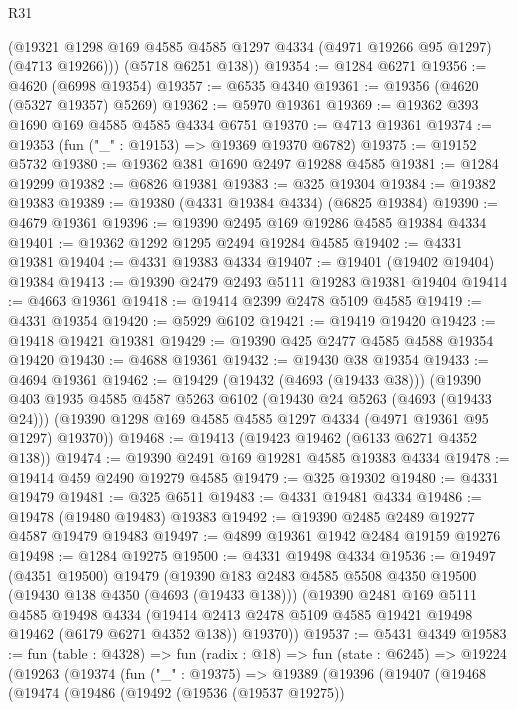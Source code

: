 \begin{lexlean}{R31}
\begin{coremodule}
        (@19321 @1298 @169 @4585 @4585 @1297 @4334 (@4971 @19266 @95 @1297) (@4713 @19266)))
      (@5718 @6251 @138))
@19354 := @1284 @6271
@19356 := @4620 (@6998 @19354)
@19357 := @6535 @4340
@19361 := @19356 (@4620 (@5327 @19357) @5269)
@19362 := @5970 @19361
@19369 := @19362 @393 @1690 @169 @4585 @4585 @4334 @6751
@19370 := @4713 @19361
@19374 := @19353 (fun ("_" : @19153) => @19369 @19370 @6782)
@19375 := @19152 @5732
@19380 := @19362 @381 @1690 @2497 @19288 @4585
@19381 := @1284 @19299
@19382 := @6826 @19381
@19383 := @325 @19304
@19384 := @19382 @19383
@19389 := @19380 (@4331 @19384 @4334) (@6825 @19384)
@19390 := @4679 @19361
@19396 := @19390 @2495 @169 @19286 @4585 @19384 @4334
@19401 := @19362 @1292 @1295 @2494 @19284 @4585
@19402 := @4331 @19381
@19404 := @4331 @19383 @4334
@19407 := @19401 (@19402 @19404) @19384
@19413 := @19390 @2479 @2493 @5111 @19283 @19381 @19404
@19414 := @4663 @19361
@19418 := @19414 @2399 @2478 @5109 @4585
@19419 := @4331 @19354
@19420 := @5929 @6102
@19421 := @19419 @19420
@19423 := @19418 @19421 @19381
@19429 := @19390 @425 @2477 @4585 @4588 @19354 @19420
@19430 := @4688 @19361
@19432 := @19430 @38 @19354
@19433 := @4694 @19361
@19462 := @19429
    (@19432 (@4693 (@19433 @38)))
    (@19390
      @403
      @1935
      @4585
      @4587
      @5263
      @6102
      (@19430 @24 @5263 (@4693 (@19433 @24)))
      (@19390 @1298 @169 @4585 @4585 @1297 @4334 (@4971 @19361 @95 @1297) @19370))
@19468 := @19413 (@19423 @19462 (@6133 @6271 @4352 @138))
@19474 := @19390 @2491 @169 @19281 @4585 @19383 @4334
@19478 := @19414 @459 @2490 @19279 @4585
@19479 := @325 @19302
@19480 := @4331 @19479
@19481 := @325 @6511
@19483 := @4331 @19481 @4334
@19486 := @19478 (@19480 @19483) @19383
@19492 := @19390 @2485 @2489 @19277 @4587 @19479 @19483
@19497 := @4899 @19361 @1942 @2484 @19159 @19276
@19498 := @1284 @19275
@19500 := @4331 @19498 @4334
@19536 := @19497
    (@4351 @19500)
    @19479
    (@19390
      @183
      @2483
      @4585
      @5508
      @4350
      @19500
      (@19430 @138 @4350 (@4693 (@19433 @138)))
      (@19390
        @2481
        @169
        @5111
        @4585
        @19498
        @4334
        (@19414 @2413 @2478 @5109 @4585 @19421 @19498 @19462 (@6179 @6271 @4352 @138))
        @19370))
@19537 := @5431 @4349
@19583 := fun (table : @4328) =>
  fun (radix : @18) =>
  fun (state : @6245) =>
  @19224
    (@19263
      (@19374
        (fun ("_" : @19375) =>
        @19389
          (@19396
            (@19407
              (@19468
                (@19474
                  (@19486
                    (@19492
                      (@19536 (@19537 @19275))

\end{coremodule}
\end{lexlean}
